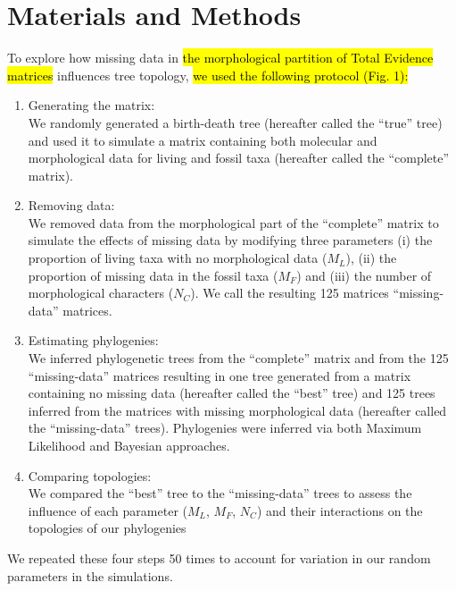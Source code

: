 \documentclass[12pt,letterpaper]{article}
\begin{document}
\section{Materials and Methods}
To explore how missing data in \hl{the morphological partition of Total Evidence matrices} influences tree topology, \hl{we used the following protocol (Fig. 1):}
\begin{enumerate}
\item{Generating the matrix:} \label{step:generate_matrix} \\
We randomly generated a birth-death tree (hereafter called the ``true'' tree) and used it to simulate a matrix containing both molecular and morphological data for living and fossil taxa (hereafter called the ``complete'' matrix).
\item{Removing data:} \label{step:remove_data} \\
We removed data from the morphological part of the ``complete'' matrix to simulate the effects of missing data by modifying three parameters (i) the proportion of living taxa with no morphological data ($M_{L}$), (ii) the proportion of missing data in the fossil taxa ($M_{F}$) and (iii) the number of morphological characters ($N_{C}$). We call the resulting 125 matrices ``missing-data'' matrices.
\item{Estimating phylogenies:} \label{step:build_phylo} \\
We inferred phylogenetic trees from the ``complete'' matrix and from the 125 ``missing-data'' matrices resulting in one tree generated from a matrix containing no missing data (hereafter called the ``best'' tree) and 125 trees inferred from the matrices with missing morphological data (hereafter called the ``missing-data'' trees). Phylogenies were inferred via both Maximum Likelihood and Bayesian approaches.
\item{Comparing topologies:} \label{step:compare_topo} \\
We compared the ``best'' tree to the ``missing-data'' trees to assess the influence of each parameter ($M_{L}$, $M_{F}$, $N_{C}$) and their interactions on the topologies of our phylogenies
\end{enumerate}
We repeated these four steps 50 times to account for variation in our random parameters in the simulations.

\end{document}

